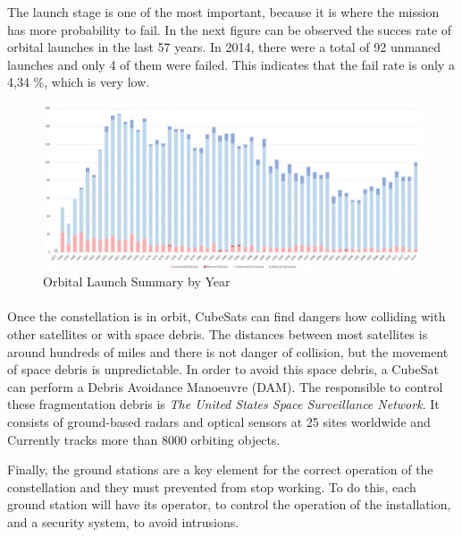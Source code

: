 The launch stage is one of the most important, because it is where the mission has more probability to fail. In the next figure can be observed the succes rate of orbital launches in the last 57 years. In 2014, there were a total of 92 unmaned launches and only 4 of them were failed. This indicates that the fail rate is only a 4,34 \%, which is very low. 

\pagebreak

\begin{figure}[h!]
\includegraphics[scale=0.3]{./OrbitalSummary}
\centering
\caption{Orbital Launch Summary by Year}
\end{figure}

\paragraph{}Once the constellation is in orbit, CubeSats can find dangers how colliding with other satellites or with space debris. The distances between most satellites is around hundreds of miles and there is not danger of collision, but the movement of space debris is unpredictable. In order to avoid this space debris, a CubeSat can perform a Debris Avoidance Manoeuvre (DAM). The responsible to control these fragmentation debris is \textit{The United States Space Surveillance Network}. It consists of ground-based radars and optical sensors at 25 sites worldwide and Currently tracks more than 8000 orbiting objects.

Finally, the ground stations are a key element for the correct operation of the constellation and they must prevented from stop working. To do this, each ground station will have its operator, to control the operation of the installation, and a security system, to avoid intrusions.

